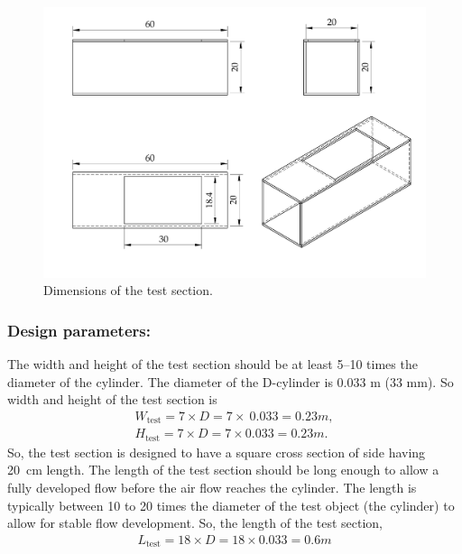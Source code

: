 \begin{figure}[H]
    \centering
    \includegraphics[width=\linewidth]{gfx/Wind_tunnel_test_section.pdf}
    \caption{Dimensions of the test section.}
    \label{fig:test section}
\end{figure}


\subsubsection{Design parameters:}
The width and height of the test section should be at least 5–10 times the diameter of the cylinder. The diameter of the D-cylinder is 0.033 m (33 mm). So width and height of the test section is 
\begin{align}
W_{\text{test}} = 7 \times D = 7 \times\ 0.033 = 0.23 m\label{width test section}, \\
H_{\text{test}} = 7 \times D = 7 \times 0.033 = 0.23 m \label{height test section}.
\end{align}
So, the test section is designed to have a square cross section of side having 20~cm length.
The length of the test section should be long enough to allow a fully developed flow before the air flow reaches the cylinder. The length is typically between 10 to 20 times the diameter of the test object (the cylinder) to allow for stable flow development. So, the length of the test section,
\begin{align}\label{length test section}
L_{\text{test}} = 18 \times D = 18 \times 0.033 =  0.6 m
\end{align}

